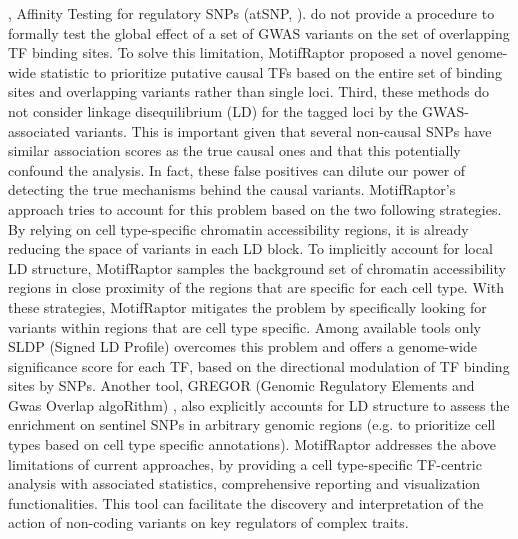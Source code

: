 \documentclass[a4paper, titlepage, openright]{book}
\newcommand{\motifraptor}{MotifRaptor\xspace}
\begin{document}
\citep{moyerbrailean2016genetics, pique2011accurate}, Affinity Testing for regulatory SNPs (atSNP, \citep{zuo2015atsnp}). do not provide a procedure to formally test the global effect of a set of GWAS variants on the set of overlapping TF binding sites. To solve this limitation, \motifraptor proposed a novel genome-wide statistic to prioritize putative causal TFs based on the entire set of binding sites and overlapping variants rather than single loci. Third, these methods do not consider linkage disequilibrium (LD) for the tagged loci by the GWAS-associated variants. This is important given that several non-causal SNPs have similar association scores as the true causal ones and that this potentially confound the analysis. In fact, these false positives can dilute our power of detecting the true mechanisms behind the causal variants. \motifraptor's approach tries to account for this problem based on the two following strategies. By relying on cell type-specific chromatin accessibility regions, it is already reducing the space of variants in each LD block. To implicitly account for local LD structure, \motifraptor samples the background set of chromatin accessibility regions in close proximity of the regions that are specific for each cell type. With these strategies, \motifraptor mitigates the problem by specifically looking for variants within regions that are cell type specific. Among available tools only SLDP (Signed LD Profile) \citep{reshef2018detecting} overcomes this problem and offers a genome-wide significance score for each TF, based on the directional modulation of TF binding sites by SNPs. Another tool, GREGOR (Genomic Regulatory Elements and Gwas Overlap algoRithm) \citep{schmidt2015gregor}, also explicitly accounts for LD structure to assess the enrichment on sentinel SNPs in arbitrary genomic regions (e.g. to prioritize cell types based on cell type specific annotations). \motifraptor addresses the above limitations of current approaches, by providing a cell type-specific TF-centric analysis with associated statistics, comprehensive reporting and visualization functionalities. This tool can facilitate the discovery and interpretation of the action of non-coding variants on key regulators of complex traits.
\end{document}
